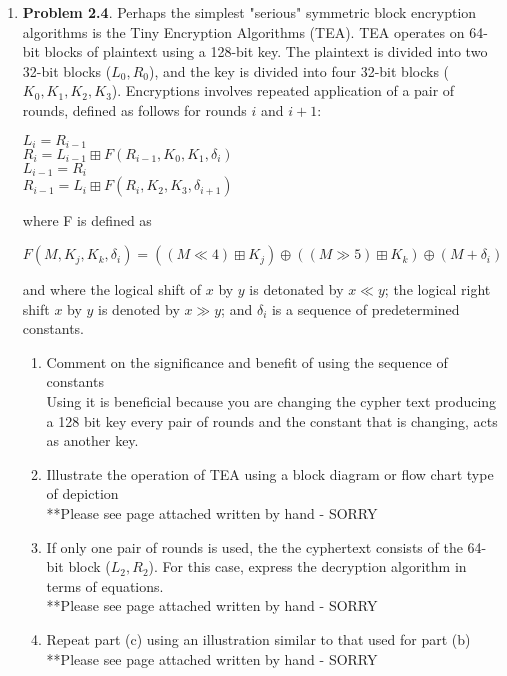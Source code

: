\documentclass[12pt]{article}
\begin{document}
\begin{enumerate}
	
	\item {\textbf{Problem 2.4}. Perhaps the simplest "serious" symmetric block encryption algorithms is the Tiny Encryption Algorithms (TEA). TEA operates on 64-bit blocks of plaintext using a 128-bit key. The plaintext is divided into two 32-bit blocks ($L_0,R_0$), and the key is divided into four 32-bit blocks ($K_0, K_1, K_2, K_3$). Encryptions involves repeated application of a pair of rounds, defined as follows for rounds $i$ and $i+1$:
	\begin{center}
	$L_i = R_{i-1}$\\
	$R_i = L_{i-1} \boxplus F(R_{i-1}, K_0, K_1, \delta_i)$\\
	$L_{i-1} = R_i$\\
	$R_{i-1} = L_i \boxplus F(R_i, K_2, K_3, \delta_{i+1})$
	\end{center}
	where F is defined as
	\begin{center}
	$F(M, K_j, K_k, \delta_i) = ((M\ll  4) \boxplus K_j) \oplus ((M \gg 5) \boxplus K_k) \oplus (M+\delta_i)$
	\end{center} } 
	and where the logical shift of $x$ by $y$ is detonated by  $x \ll y$; the logical right shift $x$ by $y$ is denoted by $x \gg y$; and $\delta_i$ is a sequence of predetermined constants. \\
		\begin{enumerate}
		\item Comment on the significance and benefit of using the sequence of constants\\
		Using it is beneficial because you are changing the cypher text producing a 128 bit key every pair of rounds and the constant that is changing, acts as another key.  

		\item Illustrate the operation of TEA using a block diagram or flow chart type of depiction\\
		**Please see page attached written by hand - SORRY 

		\item If only one pair of rounds is used, the the cyphertext consists of the 64-bit block ($L_2, R_2$). For this case, express the decryption algorithm in terms of equations. \\
		**Please see page attached written by hand - SORRY 
		\item Repeat part (c) using an illustration similar to that used for part (b) \\
	**Please see page attached written by hand - SORRY 
	\end{enumerate}
	

\end{enumerate}
\end{document}
